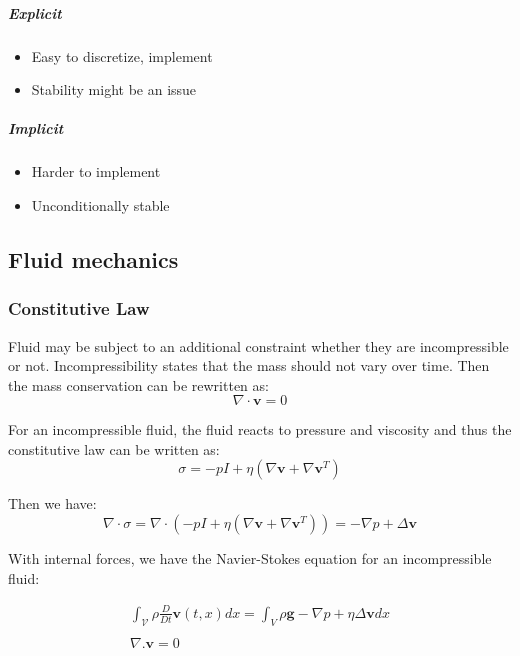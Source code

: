 \subparagraph{Explicit}
\begin{itemize}
\item Easy to discretize, implement
\item Stability might be an issue
\end{itemize}

\subparagraph{Implicit}
\begin{itemize}
\item Harder to implement
\item Unconditionally stable
\end{itemize}

\subsection{Fluid mechanics}

\subsubsection{Constitutive Law}

Fluid may be subject to an additional constraint whether they are incompressible or not. Incompressibility states that the mass should not vary over time. Then the mass conservation can be rewritten as:
\begin{equation}
\nabla \cdot \mathbf{v} = 0
\end{equation}

For an incompressible fluid, the fluid reacts to pressure and viscosity and thus the constitutive law can be written as:
\begin{equation}
\sigma = -pI + \eta \left( \nabla \mathbf{v} + \nabla \mathbf{v}^{T} \right)
\end{equation}

Then we have:
\begin{equation}
\nabla \cdot \sigma = \nabla \cdot \left( -pI + \eta \left( \nabla \mathbf{v} + \nabla \mathbf{v}^{T} \right) \right) = -\nabla p + \Delta \mathbf{v}
\end{equation}

With internal forces, we have the Navier-Stokes equation for an incompressible fluid:

\begin{equation}
\begin{array}{ll}
\displaystyle
\int_{\mathcal{V}} \rho \frac{D}{Dt} \mathbf{v}(t,x) dx = \int_{V} \rho \mathbf{g} -\nabla p + \eta \Delta \mathbf{v} dx \\ \\
\displaystyle
\nabla. \mathbf{v} = 0
\end{array}
\end{equation}

